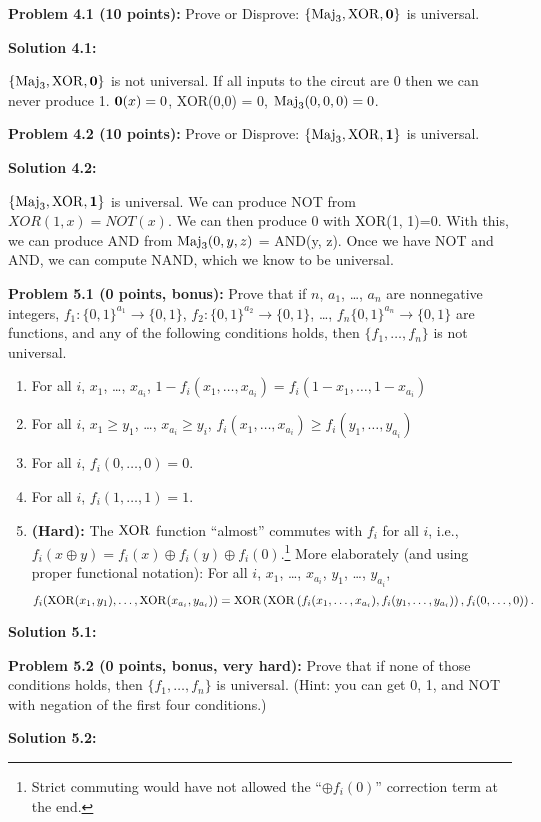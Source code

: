 \documentclass[11pt]{article}
\begin{document}
\textbf{Problem 4.1 (10 points):} Prove or Disprove:  $\{\mathrm{Maj}_3,\mathrm{XOR},\mathbf{0}\}$ is universal. 

\textbf{Solution 4.1:} %

$\{\mathrm{Maj}_3,\mathrm{XOR},\mathbf{0}\}$ is not universal. If all inputs to the circut are 0 then we can never produce 1. $\mathbf{0}(x) = 0$, XOR(0,0) = 0, $\mathrm{Maj}_3(0, 0, 0) = 0$.

\textbf{Problem 4.2 (10 points):} Prove or Disprove:  $\{\mathrm{Maj}_3,\mathrm{XOR},\mathbf{1}\}$ is universal. 

\textbf{Solution 4.2:} %

$\{\mathrm{Maj}_3,\mathrm{XOR},\mathbf{1}\}$ is universal. We can produce NOT from $XOR(1, x) = NOT(x)$. We can then produce $0$ with XOR(1, 1)=0. With this, we can produce AND from $\mathrm{Maj}_3(0, y, z)$ = AND(y, z). Once we have NOT and AND, we can compute NAND, which we know to be universal.

\newpage

\textbf{Problem 5.1 (0 points, bonus):} Prove that if $n$, $a_1$, \ldots, $a_n$ are nonnegative integers, $f_1: \{0, 1\}^{a_1} \to \{0,1\}$, $f_2: \{0, 1\}^{a_2} \to \{0,1\}$, \ldots, $f_n\{0, 1\}^{a_n} \to \{0,1\}$ are functions, and any of the following conditions holds, then $\{f_1, \ldots, f_n\}$ is not universal.

\begin{enumerate}
\item For all $i$, $x_1$, \ldots, $x_{a_i}$, $1-f_i(x_1, \ldots, x_{a_i}) = f_i(1-x_1, \ldots, 1-x_{a_i})$
\item For all $i$, $x_1 \ge y_1$, \ldots, $x_{a_i} \ge y_i$, $f_i(x_1, \ldots, x_{a_i}) \ge f_i(y_1, \ldots, y_{a_i})$
\item For all $i$, $f_i(0, \ldots, 0) = 0$.
\item For all $i$, $f_i(1, \ldots, 1) = 1$.
\item {\bf (Hard):} The $\mathrm{XOR}$ function ``almost'' commutes with $f_i$ for all $i$, i.e., $f_i(x \oplus y) = f_i(x) \oplus f_i(y) \oplus f_i(0)$.\footnote{Strict commuting would have not allowed the ``$\oplus f_i(0)$'' correction term at the end.} More elaborately (and using proper functional notation): For all $i$, $x_1$, \ldots, $x_{a_i}$, $y_1$, \ldots, $y_{a_i}$, 
$$f_i(\mathrm{XOR}(x_1, y_1), \ldots, \mathrm{XOR}(x_{a_i}, y_{a_i})) = \mathrm{XOR} \left(\mathrm{XOR}\left(f_i(x_1, \ldots, x_{a_i}),f_i(y_1, \ldots, y_{a_i})\right),f_i(0,\ldots,0) \right).$$
\end{enumerate}

\textbf{Solution 5.1:} %

\textbf{Problem 5.2 (0 points, bonus, very hard):} Prove that if none of those conditions holds, then $\{f_1, \ldots, f_n\}$ is universal. (Hint: you can get 0, 1, and NOT with negation of the first four conditions.)

\textbf{Solution 5.2:} %
\end{document}
